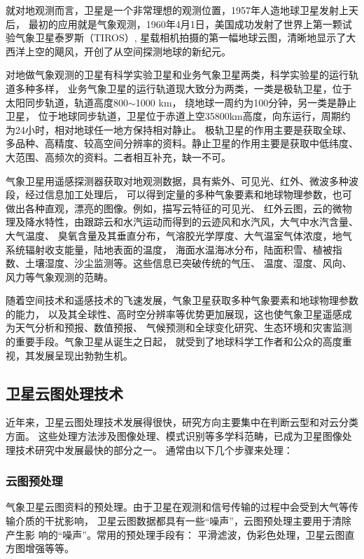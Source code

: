 就对地观测而言，卫星是一个非常理想的观测位置，1957年人造地球卫星发射上天后，
最初的应用就是气象观测，1960年4月1日，美国成功发射了世界上第一颗试验气象卫星泰罗斯（TIROS）, 
星载相机拍摄的第一幅地球云图，清晰地显示了大西洋上空的飓风，开创了从空间探测地球的新纪元。

对地做气象观测的卫星有科学实验卫星和业务气象卫星两类，科学实验星的运行轨道多种多样，
业务气象卫星的运行轨道现大致分为两类，一类是极轨卫星，位于太阳同步轨道，轨道高度800$\sim$1000 km，
绕地球一周约为100分钟，另一类是静止卫星，
位于地球同步轨道，卫星位于赤道上空35800km高度，向东运行，周期约为24小时，相对地球任一地方保持相对静止。
极轨卫星的作用主要是获取全球、多品种、高精度、较高空间分辨率的资料。静止卫星的作用主要是获取中低纬度、
大范围、高频次的资料。二者相互补充，缺一不可。

气象卫星用遥感探测器获取对地观测数据，具有紫外、可见光、红外、微波多种波段，经过信息加工处理后，
可以得到定量的多种气象要素和地球物理参数，也可做出各种直观，漂亮的图像。例如，描写云特征的可见光、
红外云图，云的微物理及降水特性，由跟踪云和水汽运动而得到的云迹风和水汽风，大气中水汽含量、大气温度、
臭氧含量及其垂直分布，气溶胶光学厚度、大气温室气体浓度，地气系统辐射收支能量，陆地表面的温度，
海面水温海冰分布，陆面积雪、植被指数、土壤湿度、沙尘监测等。这些信息已突破传统的气压、
温度、湿度、风向、风力等气象观测的范畴。

随着空间技术和遥感技术的飞速发展，气象卫星获取多种气象要素和地球物理参数的能力，
以及其全球性、高时空分辨率等优势更加展现，这也使气象卫星遥感成为天气分析和预报、数值预报、
气候预测和全球变化研究、生态环境和灾害监测的重要手段。气象卫星从诞生之日起，
就受到了地球科学工作者和公众的高度重视，其发展呈现出勃勃生机。

\iffalse
\subsection{卫星云图处理技术}
近年来，卫星云图处理技术发展得很快，研究方向主要集中在判断云型和对云分类方面。
这些处理方法涉及图像处理、模式识别等多学科范畴，已成为卫星图像处理技术研究中发展最快的部分之一。
通常由以下几个步骤来处理： 

\subsubsection{云图预处理}
气象卫星云图资料的预处理。由于卫星在观测和信号传输的过程中会受到大气等传 输介质的干扰影响，
卫星云图数据都具有一些“噪声”，云图预处理主要用于清除产生影 响的“噪声”。常用的预处理手段有：
平滑滤波，伪彩色处理，卫星云图直方图增强等等。


